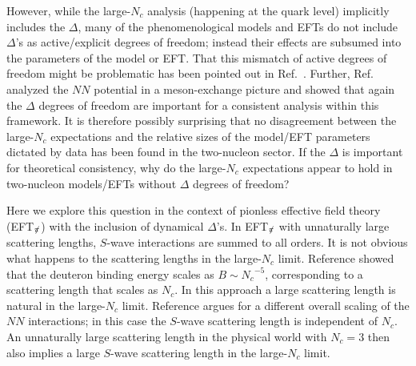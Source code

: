 \documentclass[nofootinbib, preprint, aps, prc, superscriptaddress,11pt]{revtex4-1}
\newcommand{\Nc}{\ensuremath{N_c}\xspace}
\newcommand{\NN}{\ensuremath{N\!N}\xspace}
\newcommand\Swave{$S$-wave\xspace}
\newcommand{\1}{\mathbbm{1}}
\newcommand{\nopi}{\ensuremath{\pi\hskip-0.40em /}}
\newcommand{\eftnopi}{EFT$_{\nopi}$\xspace}
\newcommand{\D}{\ensuremath{\Delta}\xspace}
\begin{document}
However, while the large-\Nc analysis (happening at the quark level) implicitly includes the \D, many of the phenomenological models and EFTs do not include \D's as active/explicit  degrees of freedom; instead their effects are subsumed into the parameters of the model or EFT.
That this mismatch of active degrees of freedom might be problematic has been pointed out in Ref.~\cite{Kaplan:1996rk}.
Further, Ref.~\cite{Banerjee:2001js} analyzed the \NN potential in a meson-exchange picture and showed that again the $\Delta$ degrees of freedom are important  for a consistent analysis within this framework.
It is therefore possibly surprising that no disagreement between the large-\Nc expectations and the relative sizes of the model/EFT parameters dictated by data has been found in the two-nucleon sector. 
If the \D is important for theoretical consistency, 
why do the large-\Nc expectations appear to hold in two-nucleon models/EFTs without \D degrees of freedom?


Here we explore this question in the context of pionless effective field theory (\eftnopi) with the inclusion of dynamical \D's. 
In \eftnopi with unnaturally large scattering lengths, $S$-wave interactions are summed to all orders. 
It is not obvious what happens to the scattering lengths in the large-\Nc limit. 
Reference \cite{Beane:2002ab} showed that the deuteron binding energy scales as $B\sim \Nc^{-5}$, corresponding to a scattering length that scales as $\Nc$. 
In this approach a large scattering length is natural in the large-\Nc limit. Reference \cite{Chen:2017tgv} argues for a different overall scaling of the \NN interactions; in this case the \Swave scattering length is independent of \Nc. 
An unnaturally large scattering length in the physical world with $\Nc=3$ then also implies a large \Swave scattering length in the large-\Nc limit.
\end{document}
